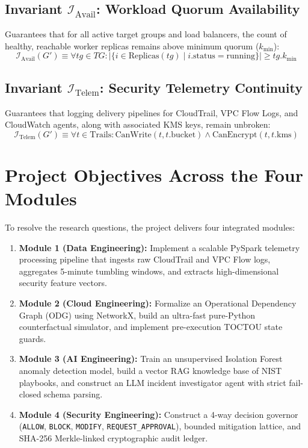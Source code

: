 \documentclass[12pt,a4paper]{report}
\begin{document}
\subsection{Invariant $\mathcal{I}_{\text{Avail}}$: Workload Quorum Availability}
Guarantees that for all active target groups and load balancers, the count of healthy, reachable worker replicas remains above minimum quorum ($k_{\text{min}}$):
\begin{equation}
    \mathcal{I}_{\text{Avail}}(G') \equiv \forall tg \in TG: |\{i \in \text{Replicas}(tg) \mid i.\text{status} = \text{running}\}| \ge tg.k_{\text{min}}
\end{equation}

\subsection{Invariant $\mathcal{I}_{\text{Telem}}$: Security Telemetry Continuity}
Guarantees that logging delivery pipelines for CloudTrail, VPC Flow Logs, and CloudWatch agents, along with associated KMS keys, remain unbroken:
\begin{equation}
    \mathcal{I}_{\text{Telem}}(G') \equiv \forall t \in \text{Trails}: \text{CanWrite}(t, t.\text{bucket}) \land \text{CanEncrypt}(t, t.\text{kms})
\end{equation}

\section{Project Objectives Across the Four Modules}\label{sec:objectives}
To resolve the research questions, the project delivers four integrated modules:
\begin{enumerate}
    \item \textbf{Module 1 (Data Engineering):} Implement a scalable PySpark telemetry processing pipeline that ingests raw CloudTrail and VPC Flow logs, aggregates 5-minute tumbling windows, and extracts high-dimensional security feature vectors.
    \item \textbf{Module 2 (Cloud Engineering):} Formalize an Operational Dependency Graph (ODG) using NetworkX, build an ultra-fast pure-Python counterfactual simulator, and implement pre-execution TOCTOU state guards.
    \item \textbf{Module 3 (AI Engineering):} Train an unsupervised Isolation Forest anomaly detection model, build a vector RAG knowledge base of NIST playbooks, and construct an LLM incident investigator agent with strict fail-closed schema parsing.
    \item \textbf{Module 4 (Security Engineering):} Construct a 4-way decision governor (\texttt{ALLOW}, \texttt{BLOCK}, \texttt{MODIFY}, \texttt{REQUEST\_APPROVAL}), bounded mitigation lattice, and SHA-256 Merkle-linked cryptographic audit ledger.
\end{enumerate}
\end{document}
